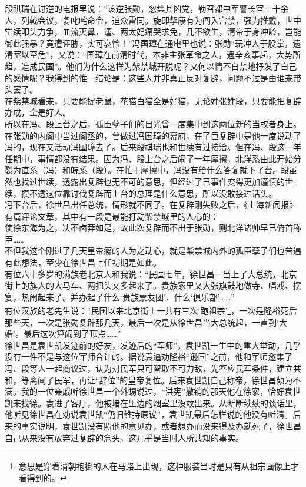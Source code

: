 段祺瑞在讨逆的电报里说：“该逆张勋，忽集其凶党，勒召都中军警长官三十余人，列戟会议，复叱咤命令，迫众雷同。旋即挈康有为闯入宫禁，强为推戴，世中堂续叩头力争，血流灭鼻，谨、两太妃痛哭求免，几不欲生，清帝于身冲龄，岂能御此强暴？竟遭诬胁，实可哀怜！”冯国璋在通电里也说：张勋“玩冲人于股掌，遗清室以至危”，又说：“国璋在前清时代，本非主张革命之人，遇辛亥事起，大势所趋，造成民国”。他们为什么这样为紫禁城开脱呢？又何以情不自禁地抒发了自己的感情呢？我得到的惟一结论是：这些人并非真正反对复辟，问题不过是由谁来带头罢了。\\

在紫禁城看来，只要能捉老鼠，花猫白猫全是好猫，无论姓张姓段，只要能把复辟办成，全是好人。\\

所以在冯、段上台之后，孤臣孽子们的目光曾一度集中到这两位新的当权者身上。在张勋的内阁中当过阁丞的，曾做过冯国璋的幕府，在了巨复辟中是他一度说动了冯的，现在又活动冯国璋去了。后来段祺瑞也和世续有过接洽。但在冯、段这一年任期中，事情都没有结果。因为冯、段上台之后闹了一年摩擦，北洋系由此开始分裂为直系（冯）和皖系（段）。在忙于摩擦中，冯没有给什么答复就下了台。段虽然也找过世续，透露出复辟也无不可的意思，但经过了巳事件变得更加谨慎的世续，摸不透这位靠讨伐复辟而上台的总理是什么意思，所以没敢接过话头。\\

冯下台后，徐世昌出任总统，情形就不同了。在复辟刚失败之后，《上海新闻报》有篇评论文章，其中有一段是最能打动紫禁城里的人心的：\\

使徐东海为之，决不卤莽如是，故此次复辟而不出于张勋，则北洋诸帅早已俯首称臣……\\

不但我这个刚过了几天皇帝瘾的人为之动心，就是紫禁城内外的孤臣孽子们也普遍有此想法，至少在徐世昌上任初期是如此。\\

有位六十多岁的满族老北京人和我说：“民国七年，徐世昌一当上了大总统，北京街上的旗人的大马车、两把头又多起来了。贵族家里又大张旗鼓地做寺、唱戏、摆宴，热闹起来了。并办起了什么‘贵族票友团’、什么‘俱乐部’……”\\

有位汉族的老先生说：“民国以来北京街上一共有三次‘跑祖宗’\footnote{意思是穿着清朝袍褂的人在马路上出现，这种服装当时是只有从祖宗画像上才看得到的。}，一次是隆裕死后那些天，一次是张勋复辟那几天，最后一次是从徐世昌当大总统起，一直到‘大婚’。最后这次算闹到了顶点……”\\

徐世昌是袁世凯发迹前的好友，发迹后的“军师”。袁世凯一生中的重大举动，几乎没有一件不是与这位军师合计的。据说袁逼劝隆裕“逊国”之前，他和军师邀集了冯、段等人一起商议过，认为对民军只可智取不可力敌，先答应民军条件，建立共和，等离间了民军，再让“辞位”的皇帝复位。后来袁世凯自己称帝，徐世昌颇为不满。我的一位亲戚听徐世昌一个外甥说过，“洪宪”撤销的那天他在徐家，恰好袁世凯来找徐。袁进了客厅，他被堵在里边的烟室里没敢出来。从断断续续的谈话里，他听见徐世昌在劝说袁世凯“仍旧维持原议”，袁世凯最后怎样说的他没有听清。后来的事实说明，袁世凯没有照他的意见办，或者想办而没来得及办就死了，徐世昌自己从来没有放弃过复辟的念头，这几乎是当时人所共知的事实。\\

